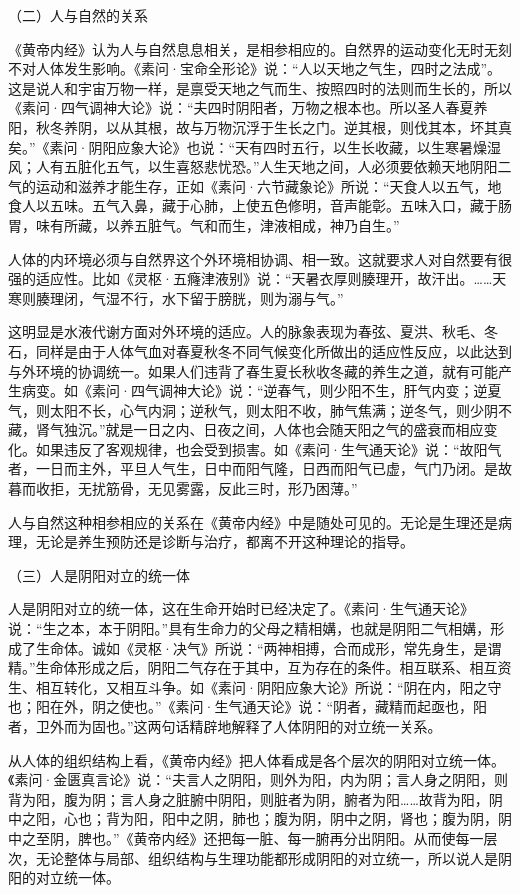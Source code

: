 \documentclass[a4paper,12pt,UTF8,twoside]{ctexbook}
\begin{document}
	（二）人与自然的关系
	
	《黄帝内经》认为人与自然息息相关，是相参相应的。自然界的运动变化无时无刻不对人体发生影响。《素问·宝命全形论》说：“人以天地之气生，四时之法成”。这是说人和宇宙万物一样，是禀受天地之气而生、按照四时的法则而生长的，所以《素问·四气调神大论》说：“夫四时阴阳者，万物之根本也。所以圣人春夏养阳，秋冬养阴，以从其根，故与万物沉浮于生长之门。逆其根，则伐其本，坏其真矣。”《素问·阴阳应象大论》也说：“天有四时五行，以生长收藏，以生寒暑燥湿风；人有五脏化五气，以生喜怒悲忧恐。”人生天地之间，人必须要依赖天地阴阳二气的运动和滋养才能生存，正如《素问·六节藏象论》所说：“天食人以五气，地食人以五味。五气入鼻，藏于心肺，上使五色修明，音声能彰。五味入口，藏于肠胃，味有所藏，以养五脏气。气和而生，津液相成，神乃自生。”
	
	人体的内环境必须与自然界这个外环境相协调、相一致。这就要求人对自然要有很强的适应性。比如《灵枢·五癃津液别》说：“天暑衣厚则腠理开，故汗出。……天寒则腠理闭，气湿不行，水下留于膀胱，则为溺与气。”
	
	这明显是水液代谢方面对外环境的适应。人的脉象表现为春弦、夏洪、秋毛、冬石，同样是由于人体气血对春夏秋冬不同气候变化所做出的适应性反应，以此达到与外环境的协调统一。如果人们违背了春生夏长秋收冬藏的养生之道，就有可能产生病变。如《素问·四气调神大论》说：“逆春气，则少阳不生，肝气内变；逆夏气，则太阳不长，心气内洞；逆秋气，则太阳不收，肺气焦满；逆冬气，则少阴不藏，肾气独沉。”就是一日之内、日夜之间，人体也会随天阳之气的盛衰而相应变化。如果违反了客观规律，也会受到损害。如《素问·生气通天论》说：“故阳气者，一日而主外，平旦人气生，日中而阳气隆，日西而阳气已虚，气门乃闭。是故暮而收拒，无扰筋骨，无见雾露，反此三时，形乃困薄。”
	
	人与自然这种相参相应的关系在《黄帝内经》中是随处可见的。无论是生理还是病理，无论是养生预防还是诊断与治疗，都离不开这种理论的指导。
	
	（三）人是阴阳对立的统一体
	
	人是阴阳对立的统一体，这在生命开始时已经决定了。《素问·生气通天论》说：“生之本，本于阴阳。”具有生命力的父母之精相媾，也就是阴阳二气相媾，形成了生命体。诚如《灵枢·决气》所说：“两神相搏，合而成形，常先身生，是谓精。”生命体形成之后，阴阳二气存在于其中，互为存在的条件。相互联系、相互资生、相互转化，又相互斗争。如《素问·阴阳应象大论》所说：“阴在内，阳之守也；阳在外，阴之使也。”《素问·生气通天论》说：“阴者，藏精而起亟也，阳者，卫外而为固也。”这两句话精辟地解释了人体阴阳的对立统一关系。
	
	从人体的组织结构上看，《黄帝内经》把人体看成是各个层次的阴阳对立统一体。《素问·金匮真言论》说：“夫言人之阴阳，则外为阳，内为阴；言人身之阴阳，则背为阳，腹为阴；言人身之脏腑中阴阳，则脏者为阴，腑者为阳……故背为阳，阴中之阳，心也；背为阳，阳中之阴，肺也；腹为阴，阴中之阴，肾也；腹为阴，阴中之至阴，脾也。”《黄帝内经》还把每一脏、每一腑再分出阴阳。从而使每一层次，无论整体与局部、组织结构与生理功能都形成阴阳的对立统一，所以说人是阴阳的对立统一体。
	
\end{document}
